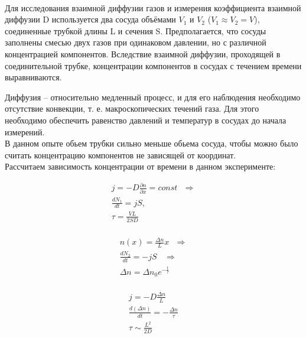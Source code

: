 \begin{center}
\begin{minipage}{0.1\textwidth}
\end{minipage}
\begin{minipage}{0.15\textwidth}
\
\end{minipage}
\begin{minipage}{0.7\textwidth}
Для исследования взаимной диффузии газов и измерения коэффициента взаимной диффузии D используется два сосуда объёмами $V_1$ и $V_2$ ($V_1 \approx V_2 = V$), соединенные трубкой длины L и сечения S. Предполагается, что сосуды заполнены смесью двух газов при одинаковом давлении, но с различной концентрацией компонентов. Вследствие взаимной диффузии, проходящей в соединительной трубке, концентрации компонентов в сосудах с течением времени выравниваются.
\end{minipage}
\end{center}
\newpage
Диффузия -- относительно медленный процесс, и для его наблюдения необходимо отсутствие конвекции, т. е. макроскопических течений газа. Для этого необходимо обеспечить равенство давлений и температур в сосудах до начала измерений.\\ 

В данном опыте обьем трубки сильно меньше обьема сосуда, чтобы можно было считать концентрацию компонентов не зависящей от координат.\\

Рассчитаем зависимость концентрации от времени в данном эксперименте:\\
\begin{center}
\begin{minipage}{0.2\textwidth}
\begin{align*}
&j = - D \frac{\partial n}{\partial x} = const \ \ \ \Rightarrow& \\
&\frac{dN_1}{dt} = jS,& \\
&\tau = \frac{VL}{2SD}&\\
\end{align*}
\end{minipage}
\begin{minipage}{0.2\textwidth}
\begin{align*}
&n(x) = \frac{\Delta n}{L} x \ \ \ \Rightarrow&\\
&\frac{dN_2}{dt} = -jS \ \ \ \ \Rightarrow&\\
&\Delta n = \Delta n_0 e^{-\frac{t}{\tau}}&\\
\end{align*}
\end{minipage}
\begin{minipage}{0.2\textwidth}
\begin{align*}
&j = - D \frac{\Delta n}{L}&\\
&\frac{d(\Delta n)}{dt} = -\frac{\Delta n}{\tau}&\\
&\tau \sim \frac{L^2}{2D}&\\
\end{align*}
\end{minipage}
\end{center}
